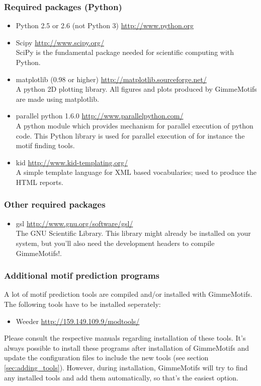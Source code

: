 \documentclass[11pt]{article}
\begin{document}
\subsubsection{Required packages (Python)}
\begin{itemize}
\item Python 2.5 or 2.6 (not Python 3) \url{http://www.python.org}
\item Scipy \url{http://www.scipy.org/} \\
SciPy is the fundamental package needed for scientific computing with Python. 
\item matplotlib (0.98 or higher) \url{http://matplotlib.sourceforge.net/} \\
A python 2D plotting library. All figures and plots produced by GimmeMotifs are made using matplotlib.
\item parallel python 1.6.0 \url{http://www.parallelpython.com/} \\
A python module which provides mechanism for parallel execution of python code. This Python library is used for parallel execution of for instance the motif finding tools. 
\item kid \url{http://www.kid-templating.org/} \\
A simple template language for XML based vocabularies; used to produce the HTML reports.
\end{itemize}

\subsubsection{Other required packages}
\begin{itemize}
 \item gsl \url{http://www.gnu.org/software/gsl/} \\
The GNU Scientific Library. 
This library might already be installed on your system, but you'll also need the development headers to compile GimmeMotifs!. 
\end{itemize}

\subsubsection{Additional motif prediction programs}
A lot of motif prediction tools are compiled and/or installed with GimmeMotifs. The following tools have to be installed seperately: 
\begin{itemize}
\item Weeder \cite{pavesi_weeder_2004} \url{http://159.149.109.9/modtools/}
\end{itemize}
Please consult the respective manuals regarding installation of these tools. It's always possible to install these programs after installation of GimmeMotifs and update the configuration files to include the new tools (see section \ref{sec:adding_tools}). However, during installation, GimmeMotifs will try to find any installed tools and add them automatically, so that's the easiest option.
\end{document}

